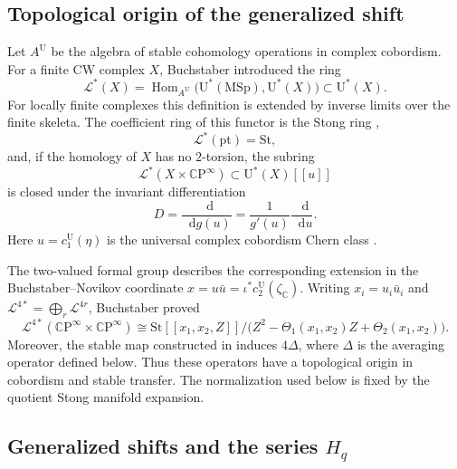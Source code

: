 \documentclass[14pt,dvipsnames]{extarticle}
\numberwithin{equation}{subsection}
\theoremstyle{plain}
\theoremstyle{definition}
\theoremstyle{definition}
\newcommand{\dd}{\mathop{}\!\mathrm d}
\newcommand{\U}{\mathrm U}
\newcommand{\MSp}{\mathrm{MSp}}
\newcommand{\CP}{\mathbb{C}\mathrm P}
\newcommand{\St}{\mathrm{St}}
\begin{document}
\subsection{Topological origin of the generalized shift}

Let $A^{\U}$ be the algebra of stable cohomology operations in complex
cobordism. For a finite CW complex $X$, Buchstaber introduced the ring
\cite[\S~4, (26)]{Buc78}
\begin{equation}\label{eq:functor-L-definition}
 \mathcal L^{*}(X)
 =\operatorname{Hom}_{A^{\U}}
   \bigl(\U^{*}(\MSp),\U^{*}(X)\bigr)
 \subset\U^{*}(X).
\end{equation}
For locally finite complexes this definition is extended by inverse limits over
the finite skeleta. The coefficient ring of this functor is the Stong ring
\cite[Lemma~6.6]{Buc78},
\begin{equation}\label{eq:L-point-Stong}
 \mathcal L^{*}(\mathrm{pt})=\St,
\end{equation}
and, if the homology of $X$ has no $2$-torsion, the subring
\[
 \mathcal L^{*}(X\times\CP^\infty)
 \subset\U^{*}(X)[[u]]
\]
is closed under the invariant differentiation
\[
 D=\frac{\dd}{\dd g(u)}
   =\frac{1}{g'(u)}\frac{\dd}{\dd u}.
\]
Here $u=c_1^{\U}(\eta)$ is the universal complex cobordism Chern class
\cite[Lemma~4.5]{Buc78}.

The two-valued formal group describes the corresponding extension in the
Buchstaber--Novikov coordinate
$x=u\bar u=\iota^*c_2^{\U}(\zeta_{\mathbb C})$.
Writing $x_i=u_i\bar u_i$ and
$\mathcal L^{4*}=\bigoplus_{r}\mathcal L^{4r}$, Buchstaber proved
\cite[Theorem~5.2(3)]{Buc78}
\begin{equation}\label{eq:L-quadratic-extension}
 \mathcal L^{4*}(\CP^\infty\times\CP^\infty)
 \cong
 \St[[x_1,x_2,Z]]
 \big/
 \bigl(Z^2-\Theta_1(x_1,x_2)Z+\Theta_2(x_1,x_2)\bigr).
\end{equation}
Moreover, the stable map constructed in \cite[Theorem~2.11]{Buc78}
induces $4\Delta$, where $\Delta$ is the averaging operator defined below.
Thus these operators have a topological origin in cobordism and stable
transfer. The normalization used below is fixed by the quotient
Stong manifold expansion.

\subsection{Generalized shifts and the series \texorpdfstring{$H_q$}{Hq}}
\end{document}
